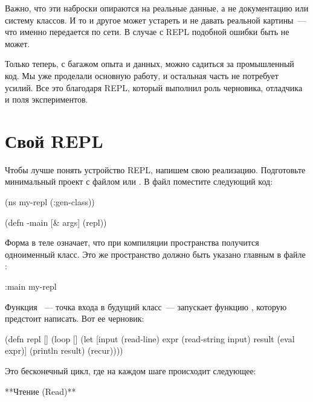 Важно, что эти наброски опираются на реальные данные, а не документацию или систему классов. И то и другое может устареть и не давать реальной картины~--- что именно передается по сети. В случае с REPL подобной ошибки быть не может.

Только теперь, с багажом опыта и данных, можно садиться за промышленный код. Мы уже проделали основную работу, и остальная часть не потребует усилий. Все это благодаря REPL, который выполнил роль черновика, отладчика и поля экспериментов.

\section{Свой REPL}

Чтобы лучше понять устройство REPL, напишем свою реализацию. Подготовьте минимальный проект с файлом  или . В файл  поместите следующий код:

\begin{english}
  \begin{clojure}
(ns my-repl
  (:gen-class))

(defn -main [& args]
  (repl))
  \end{clojure}
\end{english}

Форма  в теле  означает, что при компиляции пространства получится одноименный класс. Это же пространство должно быть указано главным в файле :

\begin{english}
  \begin{clojure}
:main my-repl
  \end{clojure}
\end{english}

Функция ~--- точка входа в будущий класс~--- запускает функцию , которую предстоит написать. Вот ее черновик:

\begin{english}
  \begin{clojure}
(defn repl []
  (loop []
    (let [input (read-line)
          expr (read-string input)
          result (eval expr)]
      (println result)
      (recur))))
  \end{clojure}
\end{english}

Это бесконечный цикл, где на каждом шаге происходит следующее:

**Чтение (Read)**

